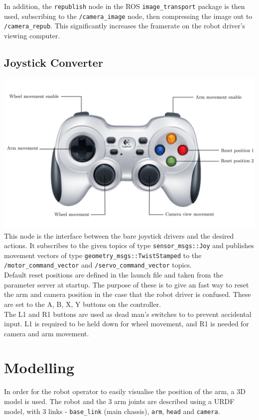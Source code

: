 \documentclass[titlepage,12pt,a4paper]{article}
\begin{document}
\noindent In addition, the \texttt{republish} node in the ROS \texttt{image\_transport} package is then used, subscribing to the \texttt{/camera\_image} node, then compressing the image out to \texttt{/camera\_repub}. This significantly increases the framerate on the robot driver's viewing computer.

\subsection{Joystick Converter}
\includegraphics[width=\textwidth]{gamepadedit}
This node is the interface between the bare joystick drivers and the desired actions. It subscribes to the given topics of type \texttt{sensor\_msgs::Joy} and publishes movement vectors of type \texttt{geometry\_msgs::TwistStamped} to the \texttt{/motor\_command\_vector} and \texttt{/servo\_command\_vector} topics.\\

\noindent Default reset positions are defined in the launch file and taken from the parameter server at startup. The purpose of these is to give an fast way to reset the arm and camera position in the case that the robot driver is confused. These are set to the A, B, X, Y buttons on the controller. \\

\noindent The L1 and R1 buttons are used as dead man's switches to to prevent accidental input. L1 is required to be held down for wheel movement, and R1 is needed for camera and arm movement.\\

\section{Modelling}
In order for the robot operator to easily visualise the position of the arm, a 3D model is used. The robot and the 3 arm joints are described using a URDF model, with 3 links - \texttt{base\_link} (main chassis), \texttt{arm}, \texttt{head} and \texttt{camera}.\\
\end{document}
